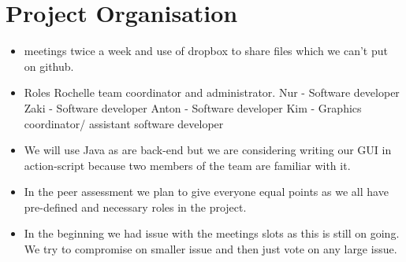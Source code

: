 \documentclass[]{article}
\begin{document}
 
 \section*{Project Organisation }
 \begin{itemize}
 \item meetings twice a week and use of dropbox to share files which we can't put on github. 
 \item Roles Rochelle team coordinator and administrator. 
 			Nur - Software developer
 			Zaki - Software developer 
 			Anton - Software developer 
 			Kim - Graphics coordinator/ assistant software developer  
 			
 \item We will use Java as are back-end but we are considering writing our GUI in action-script because two members of the team are familiar with it. 
 \item In the peer assessment we plan to give everyone equal points as we all have pre-defined and necessary roles in the project. 
 \item In the beginning we had issue with the meetings slots as this is still on going. We try to compromise on smaller issue and then just vote on any large issue.  
\end{itemize}
\end{document}

